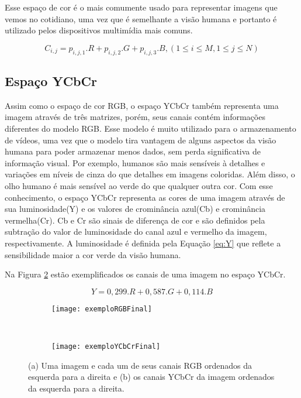 Esse espaço de cor é o mais comumente usado para representar imagens que vemos no cotidiano, uma vez que é semelhante a visão humana e portanto é utilizado pelos dispositivos multimídia mais comuns.
	
	\begin{equation}
			C_{i,j} = p_{i,j,1} . R + p_{i,j,2} . G + p_{i,j,3} . B ,  (1\leq i\leq M, 1\leq j\leq N)
	\label{eq:corRGB}
	\end{equation}

\subsection{Espaço YCbCr}\label{sect:sub:ycbcr}

Assim como o espaço de cor RGB, o espaço YCbCr também representa uma imagem através de três matrizes, porém, seus canais contém informações diferentes do modelo RGB. Esse modelo é muito utilizado para o armazenamento de vídeos, uma vez que o modelo tira vantagem de alguns aspectos da visão humana para poder armazenar menos dados, sem perda significativa de informação visual. Por exemplo, humanos são mais sensíveis à detalhes e variações em níveis de cinza do que detalhes em imagens coloridas. Além disso, o olho humano é mais sensível ao verde do que qualquer outra cor\cite{colorSpacesDigitalVideo}. Com esse conhecimento, o espaço YCbCr representa as cores de uma imagem através de sua luminosidade(Y) e os valores de crominância azul(Cb) e crominância vermelha(Cr). Cb e Cr são sinais de diferença de cor e são definidos pela subtração do valor de luminosidade do canal azul e vermelho da imagem, respectivamente. A luminosidade é definida pela Equação \ref{eq:Y}\cite{LivroVideoDigital} que reflete a sensibilidade maior a cor verde da visão humana.

Na Figura \ref{fig:Espacos:sub:YCbCr} estão exemplificados os canais de uma imagem no espaço YCbCr.

\begin{equation}
	Y = 0,299.R + 0,587.G + 0,114.B
\label{eq:Y}
\end{equation}


\begin{figure}
 \centering
\begin{subfigure}{.5\textwidth}
  \centering
  \texttt{[image: exemploRGBFinal]}
	\caption{}
	\label{fig:Espacos:sub:RGB}
	\centering
\end{subfigure}\
\begin{subfigure}{.5\textwidth}
  \centering
  \texttt{[image: exemploYCbCrFinal]}
	\caption{}
	\label{fig:Espacos:sub:YCbCr}
	\centering
\end{subfigure}
\caption{(a) Uma imagem e cada um de seus canais RGB ordenados da esquerda para a direita e (b) os canais YCbCr da imagem ordenados da esquerda para a direita.}
\label{fig:Espacos}
\centering
\end{figure}


